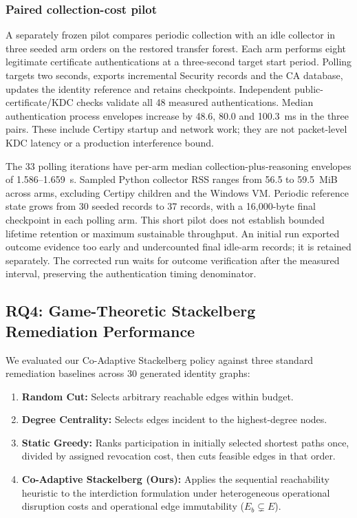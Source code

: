\subsubsection{Paired collection-cost pilot}
A separately frozen pilot compares periodic collection with an idle collector in three seeded arm orders on the restored transfer forest. Each arm performs eight legitimate certificate authentications at a three-second target start period. Polling targets two seconds, exports incremental Security records and the CA database, updates the identity reference and retains checkpoints. Independent public-certificate/KDC checks validate all 48 measured authentications. Median authentication process envelopes increase by 48.6, 80.0 and 100.3~ms in the three pairs. These include Certipy startup and network work; they are not packet-level KDC latency or a production interference bound.

The 33 polling iterations have per-arm median collection-plus-reasoning envelopes of 1.586--1.659~s. Sampled Python collector RSS ranges from 56.5 to 59.5~MiB across arms, excluding Certipy children and the Windows VM. Periodic reference state grows from 30 seeded records to 37 records, with a 16,000-byte final checkpoint in each polling arm. This short pilot does not establish bounded lifetime retention or maximum sustainable throughput. An initial run exported outcome evidence too early and undercounted final idle-arm records; it is retained separately. The corrected run waits for outcome verification after the measured interval, preserving the authentication timing denominator.

\subsection{RQ4: Game-Theoretic Stackelberg Remediation Performance}
We evaluated our Co-Adaptive Stackelberg policy against three standard remediation baselines across 30 generated identity graphs:
\begin{enumerate}
    \item \textbf{Random Cut:} Selects arbitrary reachable edges within budget.
    \item \textbf{Degree Centrality:} Selects edges incident to the highest-degree nodes.
    \item \textbf{Static Greedy:} Ranks participation in initially selected shortest paths once, divided by assigned revocation cost, then cuts feasible edges in that order.
    \item \textbf{Co-Adaptive Stackelberg (Ours):} Applies the sequential reachability heuristic to the interdiction formulation under heterogeneous operational disruption costs and operational edge immutability ($E_b \subsetneq E$).
\end{enumerate}

